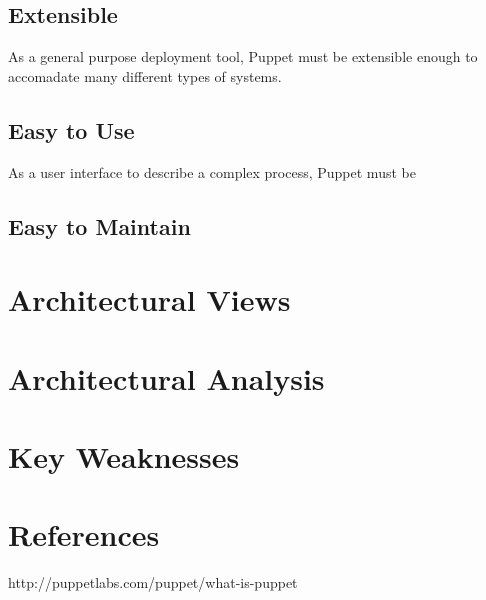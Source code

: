 \documentclass[a4paper]{article}
\begin{document}
\subsection{Extensible}

As a general purpose deployment tool, Puppet must be extensible enough to accomadate many different types of systems.

\subsection{Easy to Use}

As a user interface to describe a complex process, Puppet must be

\subsection{Easy to Maintain}


\section{Architectural Views} %



\section{Architectural Analysis} %


\section{Key Weaknesses} %


\section{References} %


http://puppetlabs.com/puppet/what-is-puppet
\end{document}
